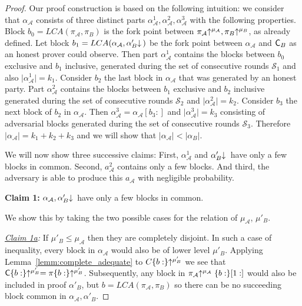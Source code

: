 \begin{proof}
	Our proof construction is based on the following intuition: we consider that $\alpha_\mathcal{A}$ consists of three distinct parts $\alpha_\mathcal{A}^1, \alpha_\mathcal{A}^2, \alpha_\mathcal{A}^3$ with the following properties.
	Block $b_0 = LCA(\pi_\mathcal{A}, \pi_B)$ is the fork point between $\pi_\mathcal{A} \negthickspace\uparrow^{\mu_\mathcal{A}}, \pi_B \negthickspace\uparrow^{\mu_B}$, as already defined.
	Let block $b_1 = LCA (\alpha_\mathcal{A}, \alpha'_B \negthickspace\downarrow\,)$ be the fork point between $\alpha_\mathcal{A}$ and $\mathsf{C}_B $ as an honest prover could observe. Then part $\alpha_\mathcal{A}^1$ contains the blocks between $b_0$ exclusive and $b_1$ inclusive, generated during the set of consecutive rounds $\mathcal{S}_1$ and also $\lvert  \alpha_\mathcal{A}^1 \rvert = k_1$.
	Consider $b_2$ the last block in $\alpha_\mathcal{A}$ that was generated by an honest party. Part $\alpha_{\mathcal{A}}^2$ contains the blocks between $b_1$ exclusive and $b_2$ inclusive generated during the set of consecutive rounds $\mathcal{S}_2$ and $\vert  \alpha_\mathcal{A}^2 \vert = k_2$.
	Consider $b_3$ the next block of $b_2$ in $\alpha_\mathcal{A}$. Then $\alpha_{\mathcal{A}}^3 = \alpha_\mathcal{A}[b_3{:}]$ and $\vert  \alpha_\mathcal{A}^3 \vert = k_3$ consisting of adversarial blocks generated during the set of consecutive rounds $\mathcal{S}_3$. Therefore $\vert \alpha_\mathcal{A} \vert = k_1 + k_2 + k_3$ and we will show that $\vert \alpha_\mathcal{A} \vert < \vert \alpha_B \vert$.

	We will now show three successive claims: First, $\alpha^1_\mathcal{A}$ and $\alpha'_B \negthickspace\downarrow\,$ have only a few blocks in common. Second, $a^2_\mathcal{A}$ contains only a few blocks.
	And third, the adversary is able to produce this $a_\mathcal{A}$ with negligible probability.

	\noindent
	\textbf{Claim 1:} $\alpha_\mathcal{A}, \alpha'_B\negthickspace\downarrow\,$ have only a few blocks in common. 

	\noindent
	We show this by taking the two possible cases for the relation of $\mu_\mathcal{A}$, $\mu'_B$.

	\noindent
	\textit{\underline{Claim 1a}:} If $\mu'_B \leq \mu_\mathcal{A}$ then they are completely
	disjoint. In such a case of inequality, every block in $\alpha_\mathcal{A}$ would also be
	of lower level $\mu'_B$. Applying Lemma~\ref{lemm:complete_adequate} to $C\{b:\}\negthickspace\uparrow^{\mu'_B}$  we see
	that $\mathsf{C}\{b:\}\negthickspace\uparrow^{\mu'_B} = \pi\{b:\}\negthickspace\uparrow^{\mu'_B}$. Subsequently, any
	block in $\pi_\mathcal{A}\negthickspace\uparrow^{\mu_\mathcal{A}}\{b:\}[1:]$ would also be included in proof
	$\alpha'_B$, but $b=LCA(\pi_\mathcal{A}, \pi_B)$ so there can be no succeeding block
	common in $\alpha_\mathcal{A}, \alpha'_B$.
	

\end{proof}
